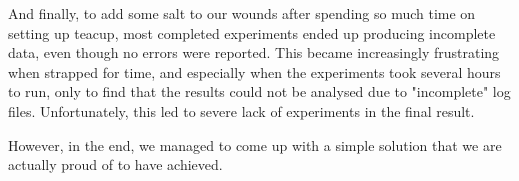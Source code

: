 And finally, to add some salt to our wounds after spending so much time on setting up \gls{teacup}, most completed experiments ended up producing incomplete data, even though no errors were reported. This became increasingly frustrating when strapped for time, and especially when the experiments took several hours to run, only to find that the results could not be analysed due to "incomplete" log files. Unfortunately, this led to severe lack of experiments in the final result.

However, in the end, we managed to come up with a simple solution that we are actually proud of to have achieved.
